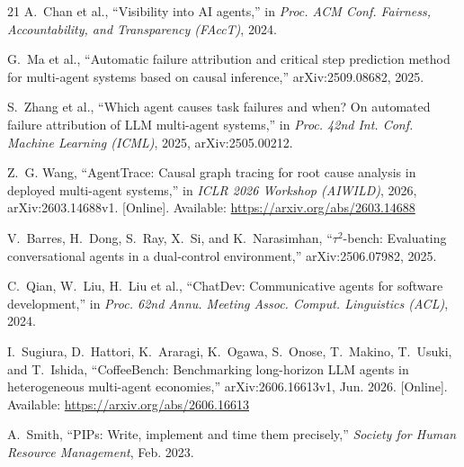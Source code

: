 \documentclass[conference]{IEEEtran}
\begin{document}
\begin{thebibliography}{21}
A.~Chan et al., ``Visibility into AI agents,'' in \emph{Proc. ACM Conf. Fairness, Accountability, and Transparency (FAccT)}, 2024.

G.~Ma et al., ``Automatic failure attribution and critical step prediction method for multi-agent systems based on causal inference,'' arXiv:2509.08682, 2025.

S.~Zhang et al., ``Which agent causes task failures and when? On automated failure attribution of LLM multi-agent systems,'' in \emph{Proc. 42nd Int. Conf. Machine Learning (ICML)}, 2025, arXiv:2505.00212.

Z.~G. Wang, ``AgentTrace: Causal graph tracing for root cause analysis in deployed multi-agent systems,'' in \emph{ICLR 2026 Workshop (AIWILD)}, 2026, arXiv:2603.14688v1. [Online]. Available: \url{https://arxiv.org/abs/2603.14688}

V.~Barres, H.~Dong, S.~Ray, X.~Si, and K.~Narasimhan, ``$\tau^2$-bench: Evaluating conversational agents in a dual-control environment,'' arXiv:2506.07982, 2025.

C.~Qian, W.~Liu, H.~Liu et al., ``ChatDev: Communicative agents for software development,'' in \emph{Proc. 62nd Annu. Meeting Assoc. Comput. Linguistics (ACL)}, 2024.

I.~Sugiura, D.~Hattori, K.~Araragi, K.~Ogawa, S.~Onose, T.~Makino, T.~Usuki, and T.~Ishida, ``CoffeeBench: Benchmarking long-horizon LLM agents in heterogeneous multi-agent economies,'' arXiv:2606.16613v1, Jun. 2026. [Online]. Available: \url{https://arxiv.org/abs/2606.16613}

A.~Smith, ``PIPs: Write, implement and time them precisely,'' \emph{Society for Human Resource Management}, Feb. 2023.

\end{thebibliography}
\end{document}
